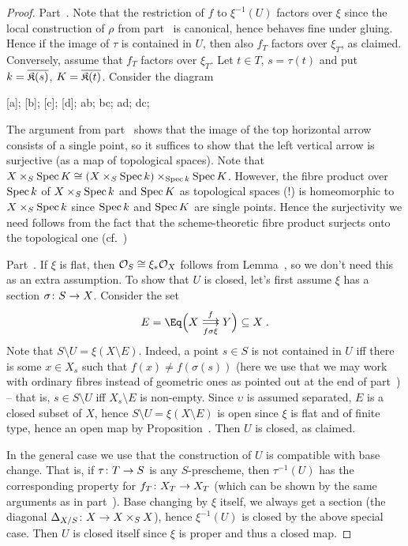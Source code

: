 \documentclass[a4paper,parskip=half,numbers=enddot, DIV=12]{scrreprt}
\begin{document}
\begin{proof}
	Part~. Note that the restriction of $f$ to $\xi^{-1}(U)$ factors over $\xi$ since the local construction of $\rho$ from part~ is canonical, hence behaves fine under gluing. Hence if the image of $\tau$ is contained in $U$, then also $f_T$ factors over $\xi_T$, as claimed. Conversely, assume that $f_T$ factors over $\xi_T$. Let $t\in T$, $s=\tau(t)$ and put $k=\overline{\mathfrak{K}(s)}$, $K=\overline{\mathfrak{K}(t)}$. Consider the diagram
	\begin{diagram}
		[a];
		[b];
		[c];
		[d];
		\scriptsize
		\arrow ab;
		\arrow bc;
		\arrow ad;
		\arrow dc;
	\end{diagram}
	The argument from part~ shows that the image of the top horizontal arrow consists of a single point, so it suffices to show that the left vertical arrow is surjective (as a map of topological spaces). Note that $X\times_S\operatorname{Spec} K\cong (X\times_S\operatorname{Spec} k)\times_{\operatorname{Spec} k}\operatorname{Spec} K$. However, the fibre product over $\operatorname{Spec} k$ of $X\times_S\operatorname{Spec} k$ and $\operatorname{Spec} K$ as topological spaces (!) is homeomorphic to $X\times_S\operatorname{Spec} k$ since $\operatorname{Spec} k$ and $\operatorname{Spec} K$ are single points. Hence the surjectivity we need follows from the fact that the scheme-theoretic fibre product surjects onto the topological one (cf.\ \cite[Corollary~1.3.2]{alggeo1})
	
	Part~. If $\xi$ is flat, then $\mathcal{O}_S\cong \xi_*\mathcal{O}_X$ follows from Lemma~, so we don't need this as an extra assumption. To show that $U$ is closed, let's first assume $\xi$ has a section $\sigma\colon S\morphism X$. Consider the set
	\begin{align*}
		E=\Eq\Big(X\doublemorphism[f][f\sigma\xi]Y\Big)\subseteq X\;.
	\end{align*}
	Note that $S\setminus U=\xi(X\setminus E)$. Indeed, a point $s\in S$ is not contained in $U$ iff there is some $x\in X_s$ such that $f(x)\neq f(\sigma(s))$ (here we use that we may work with ordinary fibres instead of geometric ones as pointed out at the end of part~) -- that is, $s\in S\setminus U$ iff $X_s\setminus E$ is non-empty. Since $\upsilon$ is assumed separated, $E$ is a closed subset of $X$, hence $S\setminus U=\xi(X\setminus E)$ is open since $\xi$ is flat and of finite type, hence an open map by Proposition~. Then $U$ is closed, as claimed.
	
	In the general case we use that the construction of $U$ is compatible with base change. That is, if $\tau\colon T\morphism S$ is any $S$-prescheme, then $\tau^{-1}(U)$ has the corresponding property for $f_T\colon X_T\morphism X_T$ (which can be shown by the same arguments as in part~). Base changing by $\xi$ itself, we always get a section (the diagonal $\Delta_{X/S}\colon X\morphism X\times_SX$), hence $\xi^{-1}(U)$ is closed by the above special case. Then $U$ is closed itself since $\xi$ is proper and thus a closed map.
\end{proof}
\end{document}
